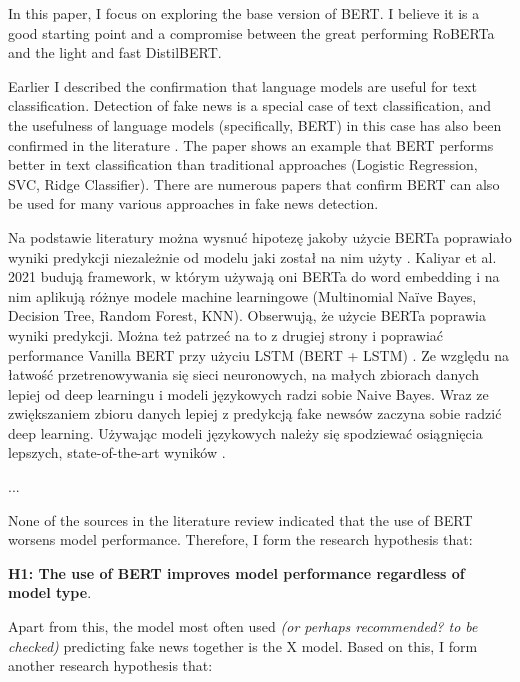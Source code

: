 In this paper, I focus on exploring the base version of BERT. I believe it is a good starting point and a compromise between the great performing RoBERTa and the light and fast DistilBERT. 

Earlier I described the confirmation that language models are useful for text classification. Detection of fake news is a special case of text classification, and the usefulness of language models (specifically, BERT) in this case has also been confirmed in the literature \autocite{Gundapu2021}. The paper \autocite{Carvajal2020} shows an example that BERT performs better in text classification than traditional approaches (Logistic Regression, SVC, Ridge Classifier).
There are numerous papers \autocite{Alonso-Bartolome2021, Wang2021, Singhal2019, Aljawarneh2022, Jwa2019, Yang2019} that confirm BERT can also be used for many various approaches in fake news detection. 

Na podstawie literatury można wysnuć hipotezę jakoby użycie BERTa poprawiało wyniki predykcji niezależnie od modelu jaki został na nim użyty \autocite{Kaliyar2021}. Kaliyar et al. 2021 budują framework, w którym używają oni BERTa do word embedding i na nim aplikują różnye modele machine learningowe (Multinomial Naïve Bayes, Decision Tree, Random Forest, KNN). Obserwują, że użycie BERTa poprawia wyniki predykcji. Można też patrzeć na to z drugiej strony i poprawiać performance Vanilla BERT przy użyciu LSTM (BERT + LSTM) \autocite{Rai2022}. 
Ze względu na łatwość przetrenowywania się sieci neuronowych, na małych zbiorach danych lepiej od deep learningu i modeli językowych radzi sobie Naive Bayes. Wraz ze zwiększaniem zbioru danych lepiej z predykcją fake newsów zaczyna sobie radzić deep learning. Używając modeli językowych należy się spodziewać osiągnięcia lepszych, state-of-the-art wyników \autocite{Khan2021}.

...

None of the sources in the literature review indicated that the use of BERT worsens model performance. Therefore, I form the research hypothesis that:
\vspace{0.2cm}

\noindent\textbf{H1: The use of BERT improves model performance regardless of model type}.
\vspace{0.2cm}

Apart from this, the model most often used \textit{(or perhaps recommended? to be checked)} predicting fake news together is the X model. Based on this, I form another research hypothesis that:
\vspace{0.2cm}

